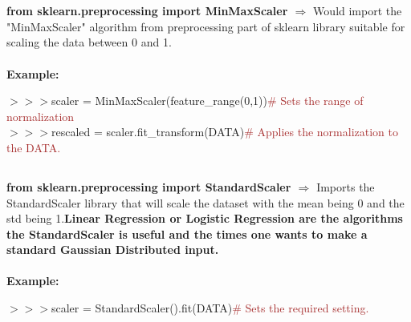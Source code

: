 \documentclass[a4paper,18pt]{article}
\begin{document}

\newpage

\section{\colorbox {Abi}{}}
\subsection{\colorbox {matgreen}{\color{white}{\large from sklearn.preprocessing import MinMaxScaler}}}
\textbf{from sklearn.preprocessing import MinMaxScaler $\Rightarrow$} Would import the "MinMaxScaler" algorithm from preprocessing part of sklearn library suitable for scaling the data between 0 and 1.\\\\
\textbf{Example:\\}

$>>>$scaler = MinMaxScaler(feature\_range(0,1)){\textcolor{brown}{\# Sets the range of normalization}}\\

$>>>$rescaled = scaler.fit\_transform(DATA){\textcolor{brown}{\# Applies the normalization to the DATA.}}\\


\subsection{\colorbox {matgreen}{\color{white}{\large from sklearn.preprocessing import StandardScaler}}}
\textbf{from sklearn.preprocessing import StandardScaler $\Rightarrow$} Imports the StandardScaler library that will scale the dataset with the mean being 0 and the std being 1.{\textbf{\textcolor{important}{Linear Regression or Logistic Regression are the algorithms the StandardScaler is useful and the times one wants to make a standard Gaussian Distributed input.}}}\\\\
\textbf{Example:\\}

$>>>$scaler = StandardScaler().fit(DATA){\textcolor{brown}{\# Sets the required setting.}}\\
\end{document}
